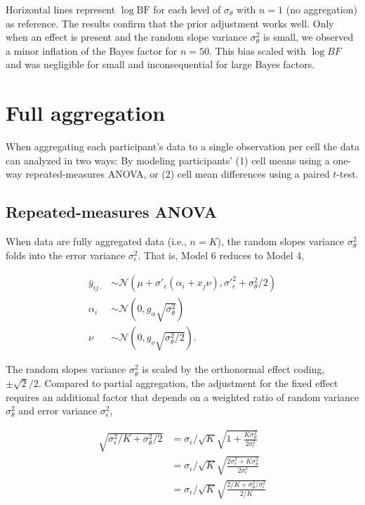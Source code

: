 \documentclass[
  a4paper,
  DIV=11,
  numbers=noendperiod,
  oneside]{scrartcl}
\begin{document}
Horizontal lines represent \(\log{\mathrm{BF}}\) for each level of
\(\sigma_\theta\) with \(n = 1\) (no aggregation) as reference. The
results confirm that the prior adjustment works well. Only when an
effect is present and the random slope variance \(\sigma_\theta^2\) is
small, we observed a minor inflation of the Bayes factor for \(n = 50\).
This bias scaled with \(\log{BF}\) and was negligible for small and
inconsequential for large Bayes factors.

\hypertarget{full-aggregation}{%
\section{Full aggregation}\label{full-aggregation}}

When aggregating each participant's data to a single observation per
cell the data can analyzed in two ways: By modeling participants' (1)
cell means using a one-way repeated-measures ANOVA, or (2) cell mean
differences using a paired \(t\)-test.

\hypertarget{repeated-measures-anova}{%
\subsection{Repeated-measures ANOVA}\label{repeated-measures-anova}}

When data are fully aggregated data (i.e., \(n = K\)), the random slopes
variance \(\sigma_\theta^2\) folds into the error variance
\(\sigma_\epsilon^2\). That is, Model 6 reduces to Model 4,

\[
\begin{aligned}
\bar{y}_{ij\cdot} & \sim \mathcal{N}(\mu + \sigma\prime_\epsilon (\alpha_i + x_j \nu), \sigma\prime_\epsilon^2 + \sigma_\theta^2/2) \\
\alpha_i & \sim \mathcal{N}(0, g_\alpha \sqrt{\sigma_\theta^2}) \\
\nu & \sim \mathcal{N}(0, g_{\nu} \sqrt{\sigma_\theta^2/2}).
\end{aligned}
\]

The random slopes variance \(\sigma_\theta^2\) is scaled by the
orthonormal effect coding, \(\pm \sqrt{2}/2\). Compared to partial
aggregation, the adjustment for the fixed effect requires an additional
factor that depends on a weighted ratio of random variance
\(\sigma^2_\theta\) and error variance \(\sigma^2_\epsilon\),

\[
\begin{aligned}
\sqrt{\sigma_\epsilon^2/K + \sigma_\theta^2/2} & = \sigma_\epsilon/\sqrt{K} \sqrt{1 + \frac{K\sigma^2_\theta}{2\sigma_\epsilon^2}} \\
  & = \sigma_\epsilon/\sqrt{K} \sqrt{\frac{2\sigma_\epsilon^2 + K\sigma^2_\theta}{2\sigma_\epsilon^2}} \\
  & = \sigma_\epsilon/\sqrt{K} \sqrt{\frac{2/K + \sigma^2_\theta/\sigma_\epsilon^2}{2/K}} \\
\end{aligned}
\]
\end{document}
